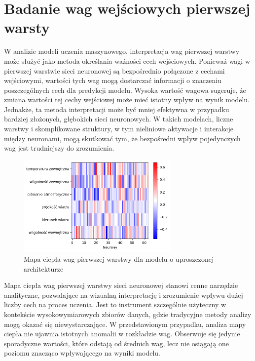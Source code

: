 \documentclass[a4paper,twoside,12pt]{book}
\begin{document}
\section{Badanie wag wejściowych pierwszej warsty}
W analizie modeli uczenia maszynowego, interpretacja wag pierwszej warstwy może służyć jako metoda określania ważności cech wejściowych. Ponieważ wagi w pierwszej warstwie sieci neuronowej są bezpośrednio połączone z cechami wejściowymi, wartości tych wag mogą dostarczać informacji o znaczeniu poszczególnych cech dla predykcji modelu. Wysoka wartość wagowa sugeruje, że zmiana wartości tej cechy wejściowej może mieć istotny wpływ na wynik modelu. Jednakże, ta metoda interpretacji może być mniej efektywna w przypadku bardziej złożonych, głębokich sieci neuronowych. W takich modelach, liczne warstwy i skomplikowane struktury, w tym nieliniowe aktywacje i interakcje między neuronami, mogą skutkować tym, że bezpośredni wpływ pojedynczych wag jest trudniejszy do zrozumienia.
\begin{figure}[!h]
  \centering
  \includegraphics[width=0.7\textwidth]{img/heatmap1.png}
  \caption{Mapa ciepła wag pierwszej warstwy dla modelu o uproszczonej architekturze}
  \label{fig:etykieta-rysunku}
\end{figure}

Mapa ciepła wag pierwszej warstwy sieci neuronowej stanowi cenne narzędzie analityczne, pozwalające na wizualną interpretację i zrozumienie wpływu dużej liczby cech na proces uczenia. Jest to instrument szczególnie użyteczny w kontekście wysokowymiarowych zbiorów danych, gdzie tradycyjne metody analizy mogą okazać się niewystarczające. W przedstawionym przypadku, analiza mapy ciepła nie ujawnia istotnych anomalii w rozkładzie wag. Obserwuje się jedynie sporadyczne wartości, które odstają od średnich wag, lecz nie osiągają one poziomu znacząco wpływającego na wyniki modelu.
\end{document}
